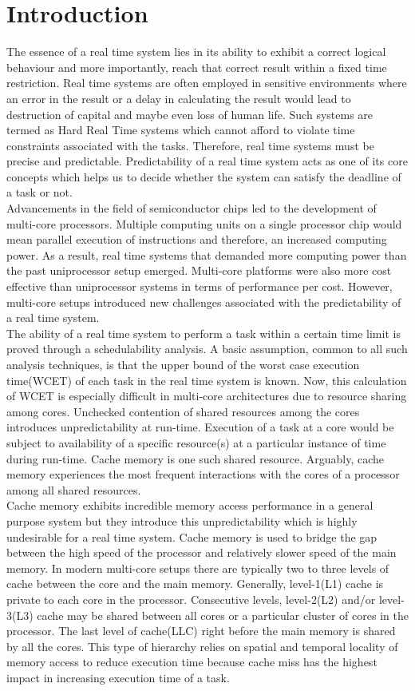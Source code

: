 \documentclass[conference]{IEEEtran}
\begin{document}
\section{Introduction}
    The essence of a real time system lies in its ability to exhibit a correct logical behaviour and more importantly, reach that correct result within a fixed time restriction. Real time systems are often employed in sensitive environments where an error in the result or a delay in calculating the result would lead to destruction of capital and maybe even loss of human life. Such systems are termed as Hard Real Time systems which cannot afford to violate time constraints associated with the tasks. Therefore, real time systems must be precise and predictable. Predictability of a real time system acts as one of its core concepts which helps us to decide whether the system can satisfy the deadline of a task or not.\\
    Advancements in the field of semiconductor chips led to the development of multi-core processors. Multiple computing units on a single processor chip would mean parallel execution of instructions and therefore, an increased computing power. As a result, real time systems that demanded more computing power than the past uniprocessor setup emerged. Multi-core platforms were also more cost effective than uniprocessor systems in terms of performance per cost. However, multi-core setups introduced new challenges associated with the predictability of a real time system.\\
    The ability of a real time system to perform a task within a certain time limit is proved through a schedulability analysis\cite{b8}. A basic assumption, common to all such analysis techniques, is that the upper bound of the worst case execution time(WCET) of each task in the real time system is known. Now, this calculation of WCET is especially difficult in multi-core architectures due to resource sharing among cores. Unchecked contention of shared resources among the cores introduces unpredictability at run-time. Execution of a task at a core would be subject to availability of a specific resource(s) at a particular instance of time during run-time. Cache memory is one such shared resource. Arguably, cache memory experiences the most frequent interactions with the cores of a processor among all shared resources.\\
    Cache memory exhibits incredible memory access performance in a general purpose system but they introduce this unpredictability which is highly undesirable for a real time system. Cache memory is used to bridge the gap between the high speed of the processor and relatively slower speed of the main memory. In modern multi-core setups there are typically two to three levels of cache between the core and the main memory. Generally, level-1(L1) cache is private to each core in the processor. Consecutive levels, level-2(L2) and/or level-3(L3) cache may be shared between all cores or a particular cluster of cores in the processor. The last level of cache(LLC) right before the main memory is shared by all the cores. This type of hierarchy relies on spatial and temporal locality of memory access to reduce execution time because cache miss has the highest impact in increasing execution time of a task.\\
\end{document}
